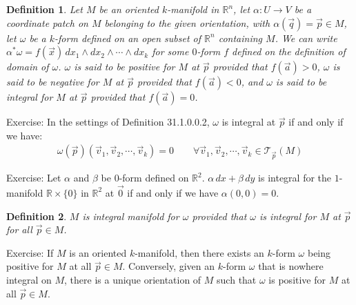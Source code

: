 \documentclass[15pt]{book}
\theoremstyle{break}
\theoremstyle{break}
\newtheorem{defn}{Definition}[corL]
\newcommand{\R}{\mathbb{R}}
\newcommand{\T}{\mathcal{T}}
\newcommand{\exercise}{\color{green}Exercise: \color{black}}
\begin{document}
\begin{defn}
Let $M$ be an oriented $k$-manifold in $\R^n$, let $\alpha: U \to V$ be a coordinate patch on $M$ belonging to the given orientation, with $\alpha(\vec{q}) = \vec{p} \in M$, let $\omega$ be a $k$-form defined on an open subset of $\R^n$ containing $M$. We can write $\alpha^*\omega = f(\vec{x}) \, dx_1 \wedge dx_2 \wedge \cdots \wedge dx_k$ for some $0$-form $f$ defined on the definition of domain of $\omega$. $\omega$ is said to be positive for $M$ at $\vec{p}$ provided that $f(\vec{a})>0$, $\omega$ is said to be negative for $M$ at $\vec{p}$ provided that $f(\vec{a})<0$, and $\omega$ is said to be integral for $M$ at $\vec{p}$ provided that $f(\vec{a})=0$.
\end{defn}

\exercise In the settings of Definition 31.1.0.0.2, $\omega$ is integral at $\vec{p}$ if and only if we have:
\begin{align*}
\omega(\vec{p}) (\vec{v}_1,\vec{v}_2,\cdots, \vec{v}_k) = 0\qquad \forall \vec{v}_1,\vec{v}_2,\cdots, \vec{v}_k \in \T_{\vec{p}}(M) 
\end{align*} 

\exercise Let $\alpha$ and $\beta$ be $0$-form defined on $\R^2$. $\alpha\, dx + \beta \, dy$ is integral for the $1$-manifold $\R\times \{0\}$ in $\R^2$ at $\vec{0}$ if and only if we have $\alpha(0,0) = 0$.\\

\begin{defn}
$M$ is integral manifold for $\omega$ provided that $\omega$ is integral for $M$ at $\vec{p}$ for all $\vec{p}\in M$. 
\end{defn}

\exercise If $M$ is an oriented $k$-manifold, then there exists an $k$-form $\omega$ being positive for $M$ at all $\vec{p} \in M$. Conversely, given an $k$-form $\omega$ that is nowhere integral on $M$, there is a unique orientation of $M$ such that $\omega$ is positive for $M$ at all $\vec{p}\in M$.\\
\end{document}
